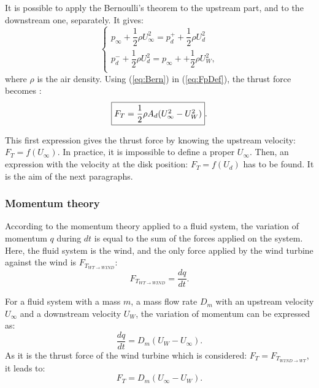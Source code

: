 It is possible to apply the Bernoulli’s theorem to the upstream part, and to the downstream one, separately. It gives: 
\begin{equation}
\label{eq:Bern}
\left\lbrace
\begin{array}{ccc}		
p_\infty + \dfrac{1}{2} \rho U_\infty^2 = p_d^+ + \dfrac{1}{2} \rho U_d^2
\\
p_d^- + \dfrac{1}{2} \rho U_d^2 = p_\infty+ + \dfrac{1}{2} \rho U_W^2,
\\
\end{array}\right.
\end{equation}
where $\rho$ is the air density. Using (\ref{eq:Bern}) in (\ref{eq:FpDef}), the thrust force becomes :
\begin{equation}
\fbox{$
F_T = \dfrac{1}{2} \rho A_d (U_\infty^2 -  U_W^2)
$}.
\label{eq:FpBern}
\end{equation}		

This first expression gives the thrust force by knowing the upstream velocity: $F_T = f(U_\infty)$. In practice, it is impossible to define a proper $U_\infty$. Then, an expression with the velocity at the disk position: $F_T = f(U_d)$ has to be found. It is the aim of the next paragraphs.



		\subsubsection*{Momentum theory}
				\label{p:ADNRAppliTheo}

According to the momentum theory applied to a fluid system, the variation of momentum $q$  during $dt$ is equal to the sum of the forces applied on the system. Here, the fluid system is the wind, and the only force applied by the wind turbine against the wind is $F_{T_{WT\rightarrow WIND}}$: 
\begin{equation}
F_{T_{WT\rightarrow WIND}} = \dfrac{d q}{dt}.
\end{equation} 

For a fluid system with a mass $m$, a mass flow rate $D_m$ with an upstream velocity $U_\infty$ and a downstream velocity $U_W$, the variation of momentum can be expressed as:
\begin{equation}
\dfrac{d q}{dt} = D_m (U_W - U_\infty).
\end{equation} 
\medbreak
As it is the thrust force of the wind turbine which is considered: $F_T = F_{T_{WIND\rightarrow WT}}$, it leads to:
\begin{equation}
F_T = D_m (U_\infty - U_W).
\label{eq:FpQm}
\end{equation} 


